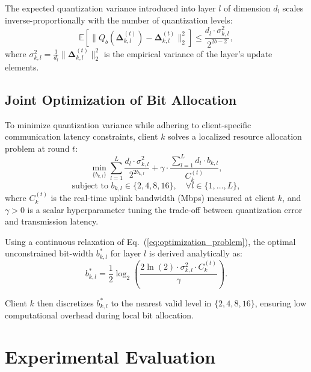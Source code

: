 \documentclass[conference]{IEEEtran}
\begin{document}
The expected quantization variance introduced into layer $l$ of dimension $d_l$ scales inverse-proportionally with the number of quantization levels:
\begin{equation}
\mathbb{E}\left[ \| Q_b(\boldsymbol{\Delta}_{k, l}^{(t)}) - \boldsymbol{\Delta}_{k, l}^{(t)} \|_2^2 \right] \le \frac{d_l \cdot \sigma_{k, l}^2}{2^{2b - 2}},
\label{eq:quant_error}
\end{equation}
where $\sigma_{k, l}^2 = \frac{1}{d_l} \|\boldsymbol{\Delta}_{k, l}^{(t)}\|_2^2$ is the empirical variance of the layer's update elements.

\subsection{Joint Optimization of Bit Allocation}
To minimize quantization variance while adhering to client-specific communication latency constraints, client $k$ solves a localized resource allocation problem at round $t$:
\begin{equation}
\min_{\{b_{k, l}\}} \sum_{l=1}^L \frac{d_l \cdot \sigma_{k, l}^2}{2^{2 b_{k, l}}} + \gamma \cdot \frac{\sum_{l=1}^L d_l \cdot b_{k, l}}{C_k^{(t)}},
\label{eq:optimization_problem}
\end{equation}
\begin{equation}
\text{subject to } b_{k, l} \in \{2, 4, 8, 16\}, \quad \forall l \in \{1, \dots, L\},
\end{equation}
where $C_k^{(t)}$ is the real-time uplink bandwidth (Mbps) measured at client $k$, and $\gamma > 0$ is a scalar hyperparameter tuning the trade-off between quantization error and transmission latency.

Using a continuous relaxation of Eq.~(\ref{eq:optimization_problem}), the optimal unconstrained bit-width $b_{k, l}^*$ for layer $l$ is derived analytically as:
\begin{equation}
b_{k, l}^* = \frac{1}{2} \log_2 \left( \frac{2 \ln(2) \cdot \sigma_{k, l}^2 \cdot C_k^{(t)}}{\gamma} \right).
\label{eq:analytic_solution}
\end{equation}

Client $k$ then discretizes $b_{k, l}^*$ to the nearest valid level in $\{2, 4, 8, 16\}$, ensuring low computational overhead during local bit allocation.

\section{Experimental Evaluation}
\end{document}
